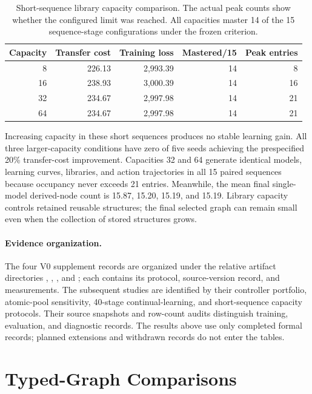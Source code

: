 \begin{table}[tb]
\centering
\small
\caption{Short-sequence library capacity comparison. The actual peak counts
show whether the configured limit was reached. All capacities master 14 of the
15 sequence-stage configurations under the frozen criterion.}
\label{tab:revision_capacity_short}
\begin{tabular}{rrrrr}
\toprule
Capacity & Transfer cost & Training loss & Mastered/15 & Peak entries \\
\midrule
8 & 226.13 & 2,993.39 & 14 & 8 \\
16 & 238.93 & 3,000.39 & 14 & 16 \\
32 & 234.67 & 2,997.98 & 14 & 21 \\
64 & 234.67 & 2,997.98 & 14 & 21 \\
\bottomrule
\end{tabular}
\end{table}

Increasing capacity in these short sequences produces no stable learning gain.
All three larger-capacity conditions have zero of five seeds achieving the
prespecified 20\% transfer-cost improvement. Capacities 32 and 64 generate
identical models, learning curves, libraries, and action trajectories in all
15 paired sequences because occupancy never exceeds 21 entries. Meanwhile,
the mean final single-model derived-node count is 15.87, 15.20, 15.19, and 15.19.
Library capacity controls retained reusable structures; the final selected
graph can remain small even when the collection of stored structures grows.

\paragraph{Evidence organization.}
The four V0 supplement records are organized under the relative artifact
directories ,
, , and ; each contains
its protocol, source-version record, and measurements. The subsequent studies
are identified by their controller portfolio, atomic-pool sensitivity,
40-stage continual-learning, and short-sequence capacity protocols. Their
source snapshots and row-count audits distinguish training, evaluation, and
diagnostic records. The results above use only completed formal records;
planned extensions and withdrawn records do not enter the tables.

\section{Typed-Graph Comparisons}
\label{app:typed_graph_comparisons}

